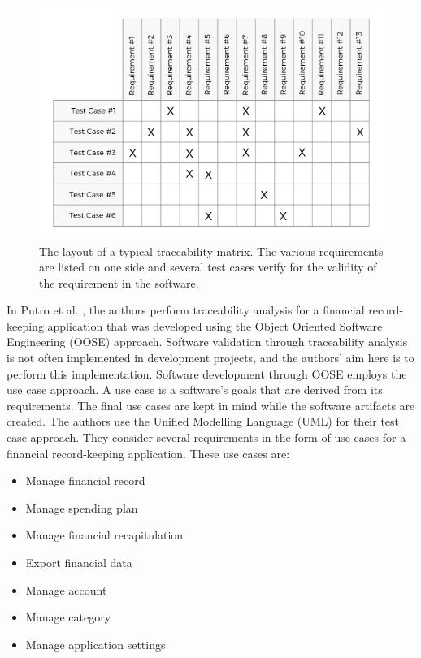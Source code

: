 \documentclass[journal, onecolumn]{IEEEtran}
\begin{document}
	\begin{figure}[H]
		\includegraphics[scale=0.5]{tm}
		\centering
		\caption{The layout of a typical traceability matrix. The various requirements are listed on one side and several test cases verify for the validity of the requirement in the software.}
	\end{figure}
	
	In Putro et al. \cite{trace}, the authors perform traceability analysis for a financial record-keeping application that was developed using the Object Oriented Software Engineering (OOSE) approach. Software validation through traceability analysis is not often implemented in development projects, and the authors' aim here is to perform this implementation.
	\newline \newline
	Software development through OOSE employs the use case approach. A use case is a software's goals that are derived from its requirements. The final use cases are kept in mind while the software artifacts are created. The authors use the Unified Modelling Language (UML) for their test case approach. 
	\newline \newline
	They consider several requirements in the form of use cases for a financial record-keeping application. These use cases are:
	\begin{itemize}
		\item Manage financial record
		\item Manage spending plan
		\item Manage financial recapitulation
		\item Export financial data
		\item Manage account
		\item Manage category
		\item Manage application settings
	\end{itemize}
	
\end{document}
